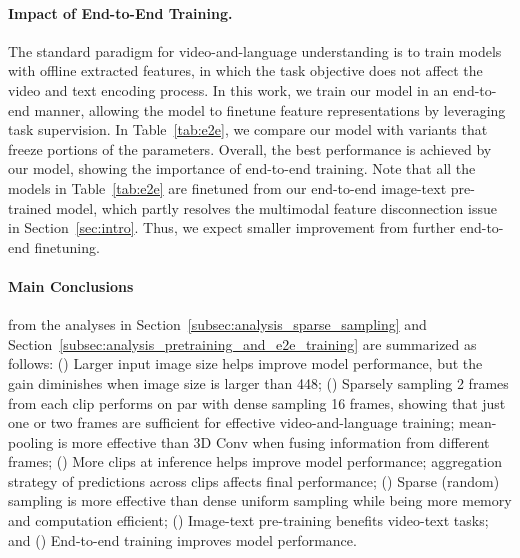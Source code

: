 \paragraph{Impact of End-to-End Training.} 
The standard paradigm for video-and-language understanding is to train models with offline extracted features, in which the task objective does not affect the video and text encoding process. 
In this work, we train our model in an end-to-end manner, allowing the model to finetune feature representations by leveraging task supervision. 
In Table~\ref{tab:e2e}, we compare our model with variants that freeze portions of the parameters.
Overall, the best performance is achieved by our model, showing the importance of end-to-end training.
Note that all the models in Table~\ref{tab:e2e} are finetuned from our end-to-end image-text  pre-trained model, which partly resolves the multimodal feature disconnection issue in Section~\ref{sec:intro}. 
Thus, we expect smaller improvement from further end-to-end finetuning.



\paragraph{Main Conclusions} from the analyses in Section~\ref{subsec:analysis_sparse_sampling} and Section~\ref{subsec:analysis_pretraining_and_e2e_training} are summarized as follows:
() Larger input image size helps improve model performance, but the gain diminishes when image size is larger than 448;
() Sparsely sampling 2 frames from each clip performs on par with dense sampling 16 frames, showing that just one or two frames are sufficient for effective video-and-language training; 
mean-pooling is more effective than 3D Conv when fusing information from different frames;
() More clips at inference helps improve model performance; aggregation strategy of predictions across clips affects final performance;
() Sparse (random) sampling is more effective than dense uniform sampling while being more memory and computation efficient;
() Image-text pre-training benefits video-text tasks; 
and () End-to-end training improves model performance.



